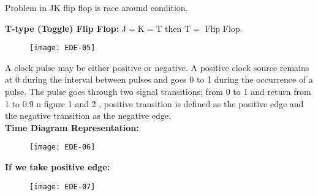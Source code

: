 \begin{note}
Problem in JK flip flop is race around condition.
\end{note}
 \textbf{T-type (Toggle) Flip Flop:} $\mathrm{J}=\mathrm{K}=\mathrm{T}$ then $\mathrm{T}=$ Flip Flop.
 \begin{figure}[H]
 	\centering
 	\texttt{[image: EDE-05]}
 \end{figure}
 A clock pulse may be either positive or negative. A positive clock source remains at 0 during the interval between pulses and goes 0 to 1 during the occurrence of a pulse. The pulse goes through two signal transitions; from 0 to 1 and return from 1 to $0.9$ n figure 1 and 2 , positive transition is defined as the positive edge and the negative transition as the negative edge.\\
 \textbf{Time Diagram Representation:}
 \begin{figure}[H]
 	\centering
 	\texttt{[image: EDE-06]}
 \end{figure}
 \textbf{If we take positive edge:}
 \begin{figure}[H]
 	\centering
 	\texttt{[image: EDE-07]}
 \end{figure}
